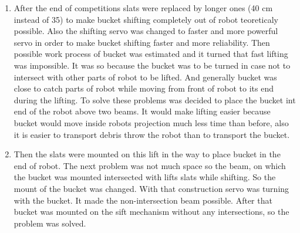 \begin{enumerate}
  \item After the end of competitions slats were replaced by longer ones (40 cm instead of 35) to make bucket shifting completely out of robot teoreticaly possible. Also the shifting servo was changed to faster and more powerful servo in order to make bucket shifting faster and more reliability. Then possible work process of bucket was estimated and it turned that fast lifting was impossible. It was so because the bucket was to be turned in case not to intersect with other parts of robot to be lifted. And generally bucket was close to catch parts of robot while moving from front of robot to its end during the lifting. To solve these problems was decided to place the bucket int end of the robot above two beams. It would make lifting easier because bucket would move inside robots projection much less time than before, also it is easier to transport debris throw the robot than to transport the bucket.
  
  \item Then the slats were mounted on this lift in the way to place bucket in the end of robot. The next problem was not much space so the beam, on which the bucket was mounted intersected with lifts slats while shifting. So the mount of the bucket was changed. 
  With that construction servo was turning with the bucket. It made the non-intersection beam possible. After that bucket was mounted on the sift mechanism without any intersections, so the problem was solved.
  

\end{enumerate}
